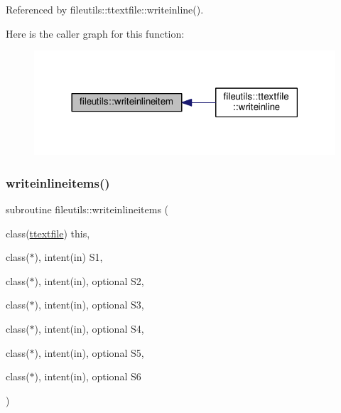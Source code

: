 Referenced by fileutils\+::ttextfile\+::writeinline().

Here is the caller graph for this function\+:
\nopagebreak
\begin{figure}[H]
\begin{center}
\leavevmode
\includegraphics[width=318pt]{namespacefileutils_af26bec360e1e147d731d1265d3b3e689_icgraph}
\end{center}
\end{figure}
\mbox{\label{namespacefileutils_acb35071046eb5e751ef36740cc5464f9}} 
\subsubsection{\texorpdfstring{writeinlineitems()}{writeinlineitems()}}
{\footnotesize\ttfamily subroutine fileutils\+::writeinlineitems (\begin{DoxyParamCaption}\item[{class(\mbox{\hyperlink{structfileutils_1_1ttextfile}{ttextfile}})}]{this,  }\item[{class($\ast$), intent(in)}]{S1,  }\item[{class($\ast$), intent(in), optional}]{S2,  }\item[{class($\ast$), intent(in), optional}]{S3,  }\item[{class($\ast$), intent(in), optional}]{S4,  }\item[{class($\ast$), intent(in), optional}]{S5,  }\item[{class($\ast$), intent(in), optional}]{S6 }\end{DoxyParamCaption})\hspace{0.3cm}{\ttfamily [private]}}

\mbox{\label{namespacefileutils_a01a3ab096e4a99267bda3254c773e55b}} 
